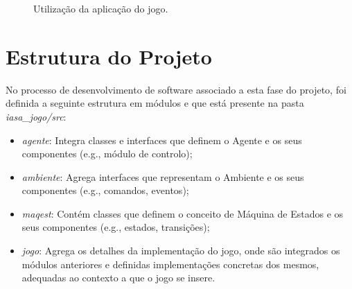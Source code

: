\begin{figure}[H]
    \begin{center}
    \end{center}
    \caption{Utilização da aplicação do jogo.}\label{fig:projeto-parte1-jogo}
\end{figure}


\section{Estrutura do Projeto}\label{sec:estrutura-do-projeto-1}

No processo de desenvolvimento de software associado a esta fase do projeto, foi definida a seguinte estrutura em módulos e que está presente na pasta \textit{iasa\_jogo/src}:

\begin{itemize}
    \item \textit{agente}: Integra classes e interfaces que definem o Agente e os seus componentes (e.g., módulo de controlo);
    \item \textit{ambiente}: Agrega interfaces que representam o Ambiente e os seus componentes (e.g., comandos, eventos);
    \item \textit{maqest}: Contém classes que definem o conceito de Máquina de Estados e os seus componentes (e.g., estados, transições);
    \item \textit{jogo}: Agrega os detalhes da implementação do jogo, onde são integrados os módulos anteriores e definidas implementações concretas dos mesmos, adequadas ao contexto a que o jogo se insere.
\end{itemize}
